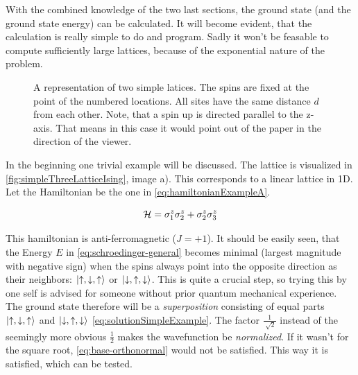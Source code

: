 With the combined knowledge of the two last sections, the ground state (and the ground state energy) can be calculated. It will become evident, that the calculation is really simple to do and program. Sadly it won't be feasable to compute sufficiently large lattices, because of the exponential nature of the problem.

\begin{figure}[htbp]
    \centering
    \vspace{-1.5cm}
    \caption{A representation of two simple latices. The spins are fixed at the point of the numbered locations. All sites have the same distance $d$ from each other. Note, that a spin up \up is directed parallel to the z-axis. That means in this case it would point out of the paper in the direction of the viewer.}
    \label{fig:simpleThreeLatticeIsing}
\end{figure}

In the beginning one trivial example will be discussed. The lattice is visualized in \autoref{fig:simpleThreeLatticeIsing}, image a).
This corresponds to a linear lattice in 1D. Let the Hamiltonian be the one in \ref{eq:hamiltonianExampleA}.

\begin{equation}
    \label{eq:hamiltonianExampleA}
    \mathcal{H} = \sigma^z_1\sigma^z_2 + \sigma^z_2\sigma^z_3
\end{equation}

This hamiltonian is anti-ferromagnetic ($J = +1$). It should be easily seen, that the Energy $E$ in \ref{eq:schroedinger-general} becomes minimal (largest magnitude with negative sign) when the spins always point into the opposite direction as their neighbors: $\ket{\uparrow, \downarrow, \uparrow}$ or $\ket{\downarrow, \uparrow, \downarrow}$. This is quite a crucial step, so trying this by one self is advised for someone without prior quantum mechanical experience.
The ground state therefore will be a \emph{superposition} consisting of equal parts $\ket{\uparrow, \downarrow, \uparrow}$ and $\ket{\downarrow, \uparrow, \downarrow}$ \ref{eq:solutionSimpleExample}. The factor $\frac{1}{\sqrt[]{2}}$ instead of the seemingly more obvious $\frac{1}{2}$ makes the wavefunction be \emph{normalized}. If it wasn't for the square root, \autoref{eq:base-orthonormal} would not be satisfied. This way it is satisfied, which can be tested.

